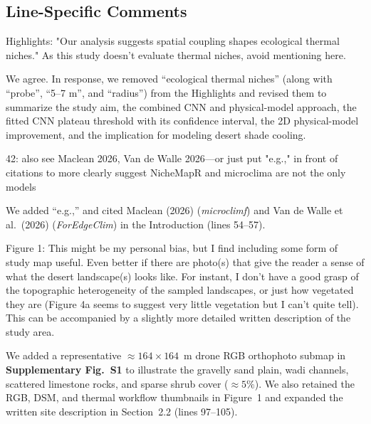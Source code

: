 \documentclass[12pt,english]{reviewresponse}
\begin{document}
\subsection*{Line-Specific Comments}

\begin{revcomment}
Highlights: "Our analysis suggests spatial coupling shapes ecological thermal niches." As this study doesn't evaluate thermal niches, avoid mentioning here.
\end{revcomment}

\begin{revresponse}
We agree. In response, we removed ``ecological thermal niches'' (along with ``probe'', ``5--7 m'', and ``radius'') from the Highlights and revised them to summarize the study aim, the combined CNN and physical-model approach, the fitted CNN plateau threshold with its confidence interval, the 2D physical-model improvement, and the implication for modeling desert shade cooling.
\end{revresponse}

\begin{revcomment}
42: also see Maclean 2026, Van de Walle 2026—or just put "e.g.," in front of citations to more clearly suggest NicheMapR and microclima are not the only models
\end{revcomment}

\begin{revresponse}
We added ``e.g.,'' and cited Maclean (2026) (\textit{microclimf}) and Van de Walle et al.\ (2026) (\textit{ForEdgeClim}) in the Introduction (lines 54--57).
\end{revresponse}

\begin{revcomment}
Figure 1: This might be my personal bias, but I find including some form of study map useful. Even better if there are photo(s) that give the reader a sense of what the desert landscape(s) looks like. For instant, I don't have a good grasp of the topographic heterogeneity of the sampled landscapes, or just how vegetated they are (Figure 4a seems to suggest very little vegetation but I can't quite tell). This can be accompanied by a slightly more detailed written description of the study area.
\end{revcomment}

\begin{revresponse}
We added a representative $\approx 164 \times 164$~m drone RGB orthophoto submap in \textbf{Supplementary Fig.~S1} to illustrate the gravelly sand plain, wadi channels, scattered limestone rocks, and sparse shrub cover ($\approx 5\%$). We also retained the RGB, DSM, and thermal workflow thumbnails in Figure~1 and expanded the written site description in Section~2.2 (lines 97--105).
\end{revresponse}
\end{document}
